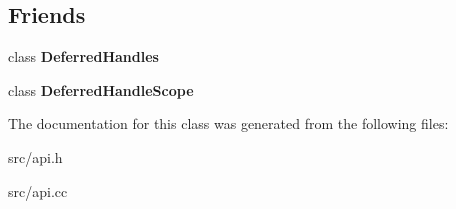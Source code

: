 \subsection*{Friends}
\begin{DoxyCompactItemize}
\item 
\hypertarget{classv8_1_1internal_1_1_handle_scope_implementer_abf66bd266bd1fddbc859832c4838b436}{}class {\bfseries Deferred\+Handles}\label{classv8_1_1internal_1_1_handle_scope_implementer_abf66bd266bd1fddbc859832c4838b436}

\item 
\hypertarget{classv8_1_1internal_1_1_handle_scope_implementer_ab79a97e63b62ac3e95a40640e3e70f96}{}class {\bfseries Deferred\+Handle\+Scope}\label{classv8_1_1internal_1_1_handle_scope_implementer_ab79a97e63b62ac3e95a40640e3e70f96}

\end{DoxyCompactItemize}


The documentation for this class was generated from the following files\+:\begin{DoxyCompactItemize}
\item 
src/api.\+h\item 
src/api.\+cc\end{DoxyCompactItemize}
